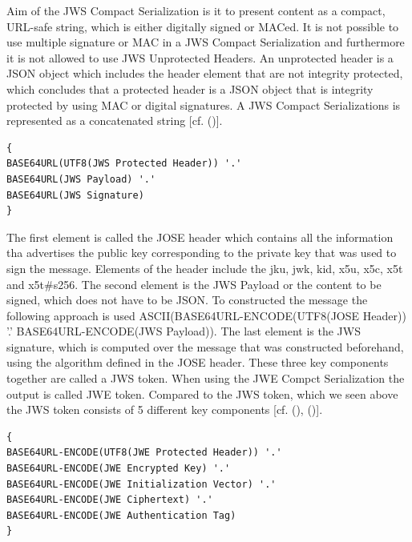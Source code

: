 {{Aim of the JWS Compact Serialization is it to present content as a compact, URL-safe string, which is either digitally signed or MACed. It is not possible to use multiple signature or MAC in a JWS Compact Serialization and furthermore it is not allowed to use JWS Unprotected Headers. An unprotected header is a JSON object which includes the header element that are not integrity protected, which concludes that a protected header is a JSON object that is integrity protected by using MAC or digital signatures. A JWS Compact Serializations is represented as a concatenated string [cf. (\cite{JWS:IETF:Jones:2015})].

\begin{lstlisting}
{
BASE64URL(UTF8(JWS Protected Header)) '.'
BASE64URL(JWS Payload) '.'
BASE64URL(JWS Signature)
}
\end{lstlisting}

The first element is called the JOSE header which contains all the information tha advertises the public key corresponding to the private key that was used to sign the message. Elements of the header include the jku, jwk, kid, x5u, x5c, x5t and x5t\#s256. The second element is the JWS Payload or the content to be signed, which does not have to be JSON. To constructed the message the following approach is used  ASCII(BASE64URL-ENCODE(UTF8(JOSE Header)) '.' BASE64URL-ENCODE(JWS Payload)). 
The last element is the JWS signature, which is computed over the message that was constructed beforehand, using the algorithm defined in the JOSE header. These three key components together are called a JWS token. When using the JWE Compct Serialization the output is called JWE token. Compared to the JWS token, which we seen above the JWS token consists of 5 different key components [cf. (\cite{JWS:IETF:Jones:2015}), (\cite{JWE:IETF:Jones:2015})].


\begin{lstlisting}
{
BASE64URL-ENCODE(UTF8(JWE Protected Header)) '.'
BASE64URL-ENCODE(JWE Encrypted Key) '.'
BASE64URL-ENCODE(JWE Initialization Vector) '.'
BASE64URL-ENCODE(JWE Ciphertext) '.'
BASE64URL-ENCODE(JWE Authentication Tag)
}
\end{lstlisting}

}}
